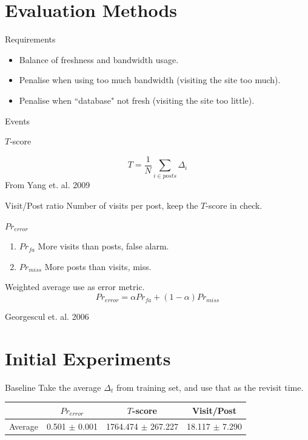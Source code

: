 \documentclass[12pt]{presentation}
\begin{document}
\section{Evaluation Methods}
\begin{frame}{Requirements}
	\begin{itemize}
		\item Balance of freshness and bandwidth usage.
		\item Penalise when using too much bandwidth (visiting the site too 
			much).
		\item Penalise when ``database" not fresh (visiting the site too 
			little).
	\end{itemize}
\end{frame}
\begin{frame}{Events}
\begin{center}
	
\end{center}
\end{frame}
\begin{frame}{$T$-score}
\begin{center}
	
\end{center}
\[
	T = \frac{1}{N} \sum_{i \in posts} \Delta_i
\]
From Yang et. al. 2009
\end{frame}
\begin{frame}{Visit/Post ratio}
	\large
	Number of visits per post, keep the $T$-score in check.
\end{frame}
\begin{frame}{$Pr_{error}$}
	\begin{center}
	
	\end{center}
\begin{enumerate}
	\item $Pr_{fa}$ More visits than posts, false alarm.
	\item $Pr_{miss}$ More posts than visits, miss.
\end{enumerate}
Weighted average use as error metric.
\[Pr_{error} = \alpha Pr_{fa} + (1 - \alpha) Pr_{miss}\]

Georgescul et. al. 2006
\end{frame}


\section{Initial Experiments}


\begin{frame}{Baseline}
Take the average $\Delta_t$ from training set, and use that as the revisit time.
	\begin{center}
		\begin{tabular}{ | l | c | c | c | }
			\hline
		& $Pr_{error}$		  & $T$-score			   &	Visit/Post\\
			\hline
 Average &		0.501 $\pm$ 0.001 &	1764.474 $\pm$ 267.227  &	18.117 $\pm$ 7.290 \\
			\hline
		\end{tabular}
	\end{center}

\end{frame}
\end{document}
